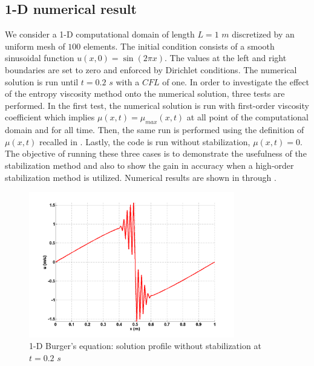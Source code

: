 \subsection{1-D numerical result}\label{sec:1dnum_sct2b}
We consider a 1-D computational domain of length $L=1$ $m$ discretized by an uniform mesh of $100$ elements. The initial condition consists of a smooth sinusoidal function $u(x,0) = \sin \left( 2 \pi x \right)$. The values at the left and right boundaries are set to zero and enforced by Dirichlet conditions. The numerical solution is run until $t=0.2$ $s$ with a $CFL$ of one. In order to investigate the effect of the entropy viscosity method onto the numerical solution, three tests are performed. In the first test, the numerical solution is run with first-order viscosity coefficient which implies $\mu(x,t) = \mu_{max}(x,t)$ at all point of the computational domain and for all time. Then, the same run is performed using the definition of $\mu(x,t)$ recalled in . Lastly, the code is run without stabilization, $\mu(x,t) = 0$. The objective of running these three cases is to demonstrate the usefulness of the stabilization method and also to show the gain in accuracy when a high-order stabilization method is utilized. Numerical results are shown in  through . 
%
\begin{figure}[H]
        \centering
        \includegraphics[width=0.8\textwidth]{figures/1D_sol_free.png}
        \caption{1-D Burger's equation: solution profile without stabilization at $t=0.2$ $s$}
        \label{fig:1d_burger_free}
\end{figure}
%
